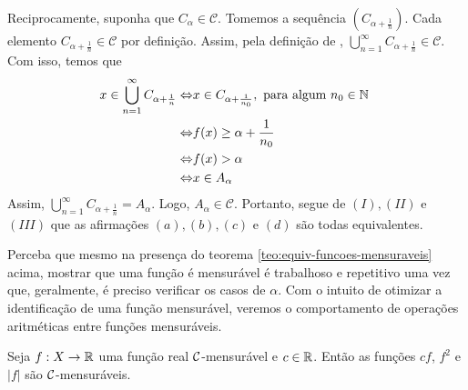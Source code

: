 \begin{prova}
Reciprocamente, suponha que $C_\alpha \in \mathcal{C}$. Tomemos a sequência $\left(C_{\alpha + \frac{1}{n}}\right)$.
Cada elemento $C_{\alpha +\frac{1}{n}} \in \mathcal{C}$ por definição.
Assim, pela definição de \sigal, 
$\displaystyle \bigcup_{n = 1}^\infty C_{\alpha +\frac{1}{n}} \in \mathcal{C}$. Com isso, temos que
\begin{align*}
    x \in \displaystyle \bigcup_{n = 1}^\infty C_{\alpha +\frac{1}{n}}
    \Leftrightarrow & x \in C_{\alpha + \frac{1}{n_0}}, \textrm{\ para algum  $n_0 \in \N$ }\\
    \Leftrightarrow & f(x)\geq \alpha +\dfrac{1}{n_0}\\
    \Leftrightarrow & f(x) > \alpha \\
    \Leftrightarrow & x \in A_\alpha
\end{align*}
Assim, $\displaystyle \bigcup_{n = 1}^\infty C_{\alpha +\frac{1}{n}} = A_\alpha$. Logo, $A_\alpha \in \mathcal{C}$.
Portanto, segue de $(I), (II)$ e $(III)$ que as afirmações $(a), (b), (c)$ e $(d)$ são todas equivalentes.


\end{prova}

Perceba que mesmo na presença do teorema \ref{teo:equiv-funcoes-mensuraveis} acima, mostrar que uma função é mensurável é trabalhoso e repetitivo uma vez que, geralmente, é preciso verificar os casos de $\alpha$.
Com o intuito de otimizar a identificação de uma função mensurável, veremos o comportamento de operações aritméticas entre funções mensuráveis.

\begin{proposition}
\label{prop:aritmetica-uma-funcao}
Seja $f: X \to \mathbb{R}$ uma função real $\operatorname{\mathcal{C}}$-mensurável e $c \in \mathbb{R}$. Então as funções $cf$, $f^2$ e $|f|$ são $\operatorname{\mathcal{C}}$-mensuráveis. 
\end{proposition}

